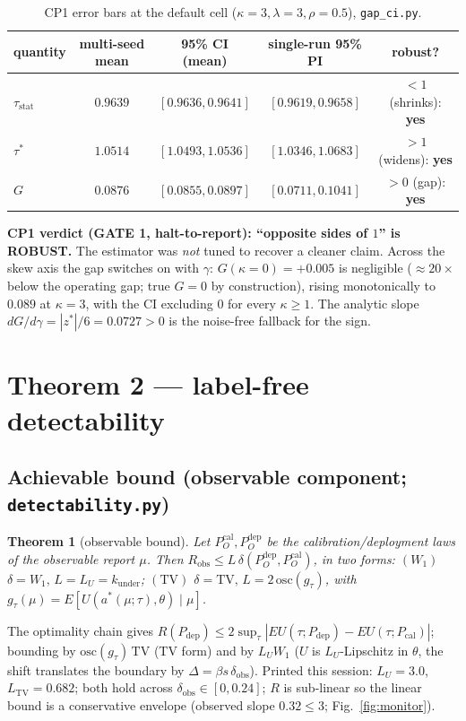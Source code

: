 \documentclass[11pt]{article}
\theoremstyle{plain}
\newtheorem{theorem}{Theorem}
\theoremstyle{definition}
\newcommand{\taustat}{\tau_{\mathrm{stat}}}
\newcommand{\taustar}{\tau^{*}}
\newcommand{\Robs}{R_{\mathrm{obs}}}
\newcommand{\PO}{P_{O}}
\newcommand{\osc}{\mathrm{osc}}
\begin{document}
\begin{table}[h]\centering
\caption{CP1 error bars at the default cell ($\kappa{=}3,\lambda{=}3,\rho{=}0.5$), \texttt{gap\_ci.py}.}
\label{tab:cp1}
\small
\begin{tabular}{lcccc}
\toprule
quantity & multi-seed mean & 95\% CI (mean) & single-run 95\% PI & robust? \\
\midrule
$\taustat$ & $0.9639$ & $[0.9636,0.9641]$ & $[0.9619,0.9658]$ & $<1$ (shrinks): \textbf{yes} \\
$\taustar$ & $1.0514$ & $[1.0493,1.0536]$ & $[1.0346,1.0683]$ & $>1$ (widens): \textbf{yes} \\
$G$        & $0.0876$ & $[0.0855,0.0897]$ & $[0.0711,0.1041]$ & $>0$ (gap): \textbf{yes} \\
\bottomrule
\end{tabular}
\end{table}

\noindent\textbf{CP1 verdict (GATE 1, halt-to-report): ``opposite sides of $1$'' is ROBUST.} The
estimator was \emph{not} tuned to recover a cleaner claim. Across the skew axis the gap switches on
with $\gamma$: $G(\kappa{=}0)=+0.005$ is negligible ($\approx 20\times$ below the operating gap; true
$G=0$ by construction), rising monotonically to $0.089$ at $\kappa{=}3$, with the CI excluding $0$ for
every $\kappa\ge1$. The analytic slope $dG/d\gamma=|z^*|/6=0.0727>0$ is the noise-free fallback for the
sign.

\section{Theorem 2 --- label-free detectability}
\subsection{Achievable bound (observable component; \texttt{detectability.py})}
\begin{theorem}[observable bound]
Let $\PO^{\mathrm{cal}},\PO^{\mathrm{dep}}$ be the calibration/deployment laws of the observable report
$\mu$. Then $\Robs\le L\,\delta(\PO^{\mathrm{dep}},\PO^{\mathrm{cal}})$, in two forms: $(W_1)$
$\delta=W_1,\,L=L_U=k_{\mathrm{under}}$; $(\mathrm{TV})$ $\delta=\mathrm{TV},\,L=2\,\osc(g_\tau)$, with
$g_\tau(\mu)=E[U(a^*(\mu;\tau),\theta)\mid\mu]$.
\end{theorem}
\noindent The optimality chain gives $R(P_{\mathrm{dep}})\le 2\sup_\tau|EU(\tau;P_{\mathrm{dep}})-EU(\tau;P_{\mathrm{cal}})|$;
bounding by $\osc(g_\tau)\,\mathrm{TV}$ (TV form) and by $L_U W_1$ ($U$ is $L_U$-Lipschitz in $\theta$,
the shift translates the boundary by $\Delta=\beta s\,\delta_{\mathrm{obs}}$). Printed this session:
$L_U=3.0$, $L_{\mathrm{TV}}=0.682$; both hold across $\delta_{\mathrm{obs}}\in[0,0.24]$; $R$ is
sub-linear so the linear bound is a conservative envelope (observed slope $0.32\le3$;
Fig.~\ref{fig:monitor}).
\end{document}
